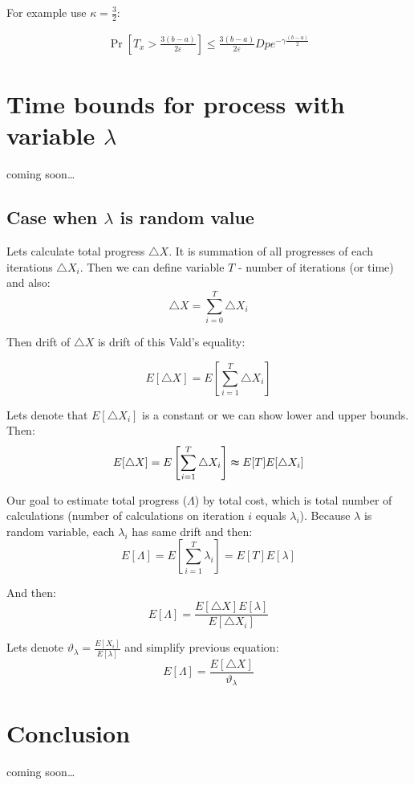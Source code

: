 \documentclass[12pt, a4paper]{article}
\theoremstyle{remark}
\newcommand{\cm}{coming soon\dots}
\begin{document}
For example use $\kappa = \frac{3}{2}$:

\begin{align*}
    \Pr\left[T_x > \frac{3 (b - a)}{2\varepsilon}\right] \leq \frac{3(b - a)}{2\varepsilon} D p e^{-\gamma\frac{(b - a)}{2}}
\end{align*}

\section{Time bounds for process with variable $\lambda$}
\cm
\subsection{Case when $\lambda$ is random value}
Lets calculate total progress $\triangle X$. It is summation of all progresses of each iterations $\triangle X_i$. Then we can define variable $T$ - number of iterations (or time) and also:
\[
    \triangle X = \sum_{i = 0}^{T} \triangle X_i
\]

Then drift of $\triangle X$ is drift of this Vald's equality: 

\[
    E[\triangle X] = E\left[\sum_{i = 1}^{T} \triangle X_i\right]      
\]

Lets denote that $E[\triangle X_i]$ is a constant or we can show lower and upper bounds. Then:
\[
    E[\triangle X] = E\left[\sum_{i = 1}^{T} \triangle X_i\right] \thickapprox E[T] E[\triangle X_i]      
\]

Our goal to estimate total progress ($\Lambda$) by total cost, which is total number of calculations (number of calculations on iteration $i$ equals $\lambda_i$). Because $\lambda$ is random variable, each $\lambda_i$ has same drift and then:
\[
    E\left[\Lambda\right] = E\left[\sum_{i = 1}^{T} \lambda_i\right] = E[T] E[\lambda]    
\]

And then: 
\[
        E[\Lambda] = \frac{E[\triangle X] E[\lambda]}{E[\triangle X_i]}
\]

Lets denote $\vartheta_\lambda = \frac{E[X_i]}{E[\lambda]}$ and simplify previous equation:
\[
        E[\Lambda] = \frac{E[\triangle X]}{\vartheta_\lambda}
\]

\section{Conclusion}
\cm
\end{document}
